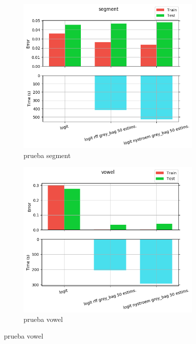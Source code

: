 \begin{figure}[ht]
  \centering
  \begin{subfigure}[b]{0.5\linewidth}
    \centering\includegraphics[width=\imgscale\linewidth]{Figures/2_3/segment}
    \caption{prueba segment}
    \label{fig:2_3_segment}
  \end{subfigure}%
  \begin{subfigure}[b]{0.5\linewidth}
    \centering\includegraphics[width=\imgscale\linewidth]{Figures/2_3/vowel}
    \caption{prueba vowel}
    \label{fig:2_3_vowel}
  \end{subfigure}
\end{figure}
